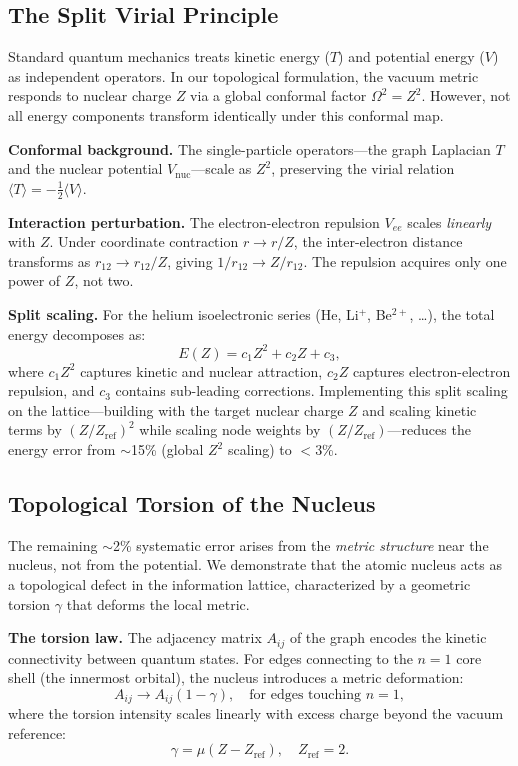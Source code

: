 \documentclass[aps,prd,twocolumn,superscriptaddress,groupedaddress,showpacs]{revtex4-2}
\begin{document}
\subsection{The Split Virial Principle}

Standard quantum mechanics treats kinetic energy ($T$) and potential energy ($V$) as independent operators. In our topological formulation, the vacuum metric responds to nuclear charge $Z$ via a global conformal factor $\Omega^2 = Z^2$. However, not all energy components transform identically under this conformal map.

\textbf{Conformal background.} The single-particle operators---the graph Laplacian $T$ and the nuclear potential $V_{\text{nuc}}$---scale as $Z^2$, preserving the virial relation $\langle T \rangle = -\tfrac{1}{2}\langle V \rangle$.

\textbf{Interaction perturbation.} The electron-electron repulsion $V_{ee}$ scales \emph{linearly} with $Z$. Under coordinate contraction $r \to r/Z$, the inter-electron distance transforms as $r_{12} \to r_{12}/Z$, giving $1/r_{12} \to Z/r_{12}$. The repulsion acquires only one power of $Z$, not two.

\textbf{Split scaling.} For the helium isoelectronic series (He, Li$^+$, Be$^{2+}$, \ldots), the total energy decomposes as:
\begin{equation}
E(Z) = c_1 Z^2 + c_2 Z + c_3,
\label{eq:split_virial}
\end{equation}
where $c_1 Z^2$ captures kinetic and nuclear attraction, $c_2 Z$ captures electron-electron repulsion, and $c_3$ contains sub-leading corrections. Implementing this split scaling on the lattice---building with the target nuclear charge $Z$ and scaling kinetic terms by $(Z/Z_{\text{ref}})^2$ while scaling node weights by $(Z/Z_{\text{ref}})$---reduces the energy error from $\sim$15\% (global $Z^2$ scaling) to $<$3\%.

\subsection{Topological Torsion of the Nucleus}

The remaining $\sim$2\% systematic error arises from the \emph{metric structure} near the nucleus, not from the potential. We demonstrate that the atomic nucleus acts as a topological defect in the information lattice, characterized by a geometric torsion $\gamma$ that deforms the local metric.

\textbf{The torsion law.} The adjacency matrix $A_{ij}$ of the graph encodes the kinetic connectivity between quantum states. For edges connecting to the $n=1$ core shell (the innermost orbital), the nucleus introduces a metric deformation:
\begin{equation}
A_{ij} \to A_{ij}(1 - \gamma), \quad \text{for edges touching } n=1,
\label{eq:torsion_law}
\end{equation}
where the torsion intensity scales linearly with excess charge beyond the vacuum reference:
\begin{equation}
\gamma = \mu(Z - Z_{\text{ref}}), \quad Z_{\text{ref}} = 2.
\label{eq:torsion_gamma}
\end{equation}
\end{document}
